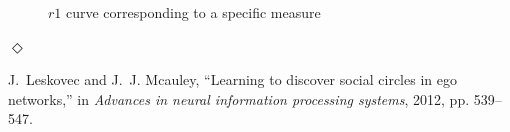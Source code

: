 \documentclass[12pt]{article}
\newcommand{\esolution}{\hfill $\Diamond$ \\ \vspace{.3cm}}
\begin{document}
\begin{enumerate}[label=(\alph*)]
\begin{figure}[htbp]
{				\label{r1_betweenness}
			}
			\quad
			\caption{$r1$ curve corresponding to a specific measure}
		\end{figure}
\end{enumerate}
\esolution

\begin{thebibliography}{9}
J.~Leskovec and J.~J. Mcauley, ``Learning to discover social circles in ego networks,'' in \emph{Advances in neural information processing systems},
2012, pp. 539--547.

\end{thebibliography}
\end{document}

